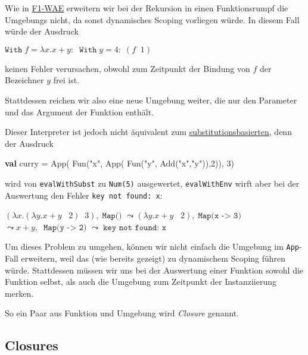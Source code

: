 \documentclass[]{article}
\newenvironment{Shaded}{}{}
\newcommand{\DecValTok}[1]{\textcolor[rgb]{0.25,0.63,0.44}{#1}}
\newcommand{\FunctionTok}[1]{\textcolor[rgb]{0.02,0.16,0.49}{#1}}
\newcommand{\KeywordTok}[1]{\textcolor[rgb]{0.00,0.44,0.13}{\textbf{#1}}}
\newcommand{\NormalTok}[1]{#1}
\newcommand{\StringTok}[1]{\textcolor[rgb]{0.25,0.44,0.63}{#1}}
\begin{document}
Wie in \protect\hyperlink{umgebungsbasierter-interpreter}{F1-WAE}
erweitern wir bei der Rekursion in einen Funktionsrumpf die Umgebungs
nicht, da sonst dynamisches Scoping vorliegen würde. In diesem Fall
würde der Ausdruck

\(\texttt{With}\; f = \lambda x.x+y:\;\; \texttt{With}\; y = 4:\; (f \;\; 1)\)

keinen Fehler verursachen, obwohl zum Zeitpunkt der Bindung von \(f\)
der Bezeichner \(y\) frei ist.

Stattdessen reichen wir also eine neue Umgebung weiter, die nur den
Parameter und das Argument der Funktion enthält.

Dieser Interpreter ist jedoch nicht äquivalent zum
\protect\hyperlink{substitutionsbasierter-interpreter-a}{substitutionsbasierten},
denn der Ausdruck

\begin{Shaded}
\begin{Highlighting}[]
\KeywordTok{val}\NormalTok{ curry = }\FunctionTok{App}\NormalTok{( }\FunctionTok{Fun}\NormalTok{(}\StringTok{"x"}\NormalTok{, }\FunctionTok{App}\NormalTok{( }\FunctionTok{Fun}\NormalTok{(}\StringTok{"y"}\NormalTok{, }\FunctionTok{Add}\NormalTok{(}\StringTok{"x"}\NormalTok{,}\StringTok{"y"}\NormalTok{)),}\DecValTok{2}\NormalTok{)), }\DecValTok{3}\NormalTok{)}
\end{Highlighting}
\end{Shaded}

wird von \texttt{evalWithSubst} zu \texttt{Num(5)} ausgewertet,
\texttt{evalWithEnv} wirft aber bei der Auswertung den Fehler
\texttt{key\ not\ found:\ x}:

\((\lambda x.(\lambda y.x+y \;\;\; 2)\;\; 3), \; \texttt{Map()}\)
\(\leadsto (\lambda y.x+y \;\;\; 2), \; \texttt{Map(x -> 3)}\)
\(\leadsto x+y, \;\; \texttt{Map(y -> 2)}\)
\(\leadsto \;\; \texttt{key not found: x}\)

Um dieses Problem zu umgehen, können wir nicht einfach die Umgebung im
\texttt{App}-Fall erweitern, weil das (wie bereits gezeigt) zu
dynamischem Scoping führen würde. Stattdessen müssen wir uns bei der
Auswertung einer Funktion sowohl die Funktion selbst, als auch die
Umgebung zum Zeitpunkt der Instanziierung merken.

So ein Paar aus Funktion und Umgebung wird \emph{Closure} genannt.

\hypertarget{closures}{%
\subsection{Closures}\label{closures}}
\end{document}

